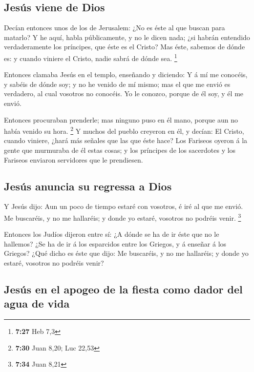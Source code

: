 \hypertarget{jesuxfas-viene-de-dios}{%
\subsection{Jesús viene de Dios}\label{jesuxfas-viene-de-dios}}

 Decían entonces unos de los de Jerusalem: ¿No es éste al
que buscan para matarlo?  Y he aquí, habla públicamente,
y no le dicen nada; ¿si habrán entendido verdaderamente los príncipes,
que éste es el Cristo?  Mas éste, sabemos de dónde es: y
cuando viniere el Cristo, nadie sabrá de dónde sea. \footnote{\textbf{7:27}
  Heb 7,3}

 Entonces clamaba Jesús en el templo, enseñando y
diciendo: Y á mí me conocéis, y sabéis de dónde soy; y no he venido de
mí mismo; mas el que me envió es verdadero, al cual vosotros no
conocéis.  Yo le conozco, porque de él soy, y él me
envió.

 Entonces procuraban prenderle; mas ninguno puso en él
mano, porque aun no había venido su hora. \footnote{\textbf{7:30} Juan
  8,20; Luc 22,53}  Y muchos del pueblo creyeron en él, y
decían: El Cristo, cuando viniere, ¿hará más señales que las que éste
hace?  Los Fariseos oyeron á la gente que murmuraba de él
estas cosas; y los príncipes de los sacerdotes y los Fariseos enviaron
servidores que le prendiesen.

\hypertarget{jesuxfas-anuncia-su-regressa-a-dios}{%
\subsection{Jesús anuncia su regressa a
Dios}\label{jesuxfas-anuncia-su-regressa-a-dios}}

 Y Jesús dijo: Aun un poco de tiempo estaré con vosotros,
é iré al que me envió.  Me buscaréis, y no me hallaréis;
y donde yo estaré, vosotros no podréis venir. \footnote{\textbf{7:34}
  Juan 8,21}

 Entonces los Judíos dijeron entre sí: ¿A dónde se ha de
ir éste que no le hallemos? ¿Se ha de ir á los esparcidos entre los
Griegos, y á enseñar á los Griegos?  ¿Qué dicho es éste
que dijo: Me buscaréis, y no me hallaréis; y donde yo estaré, vosotros
no podréis venir?

\hypertarget{jesuxfas-en-el-apogeo-de-la-fiesta-como-dador-del-agua-de-vida}{%
\subsection{Jesús en el apogeo de la fiesta como dador del agua de
vida}\label{jesuxfas-en-el-apogeo-de-la-fiesta-como-dador-del-agua-de-vida}}

